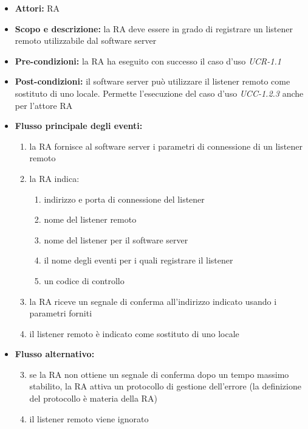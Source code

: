 \begin{itemize}
	\item \textbf{Attori:} RA
	\item \textbf{Scopo e descrizione:} la RA deve essere in grado di registrare un listener remoto utilizzabile dal software server 
	\item \textbf{Pre-condizioni:} la RA ha eseguito con successo il caso d'uso \emph{UCR-1.1}
	\item \textbf{Post-condizioni:} il software server può utilizzare il listener remoto come sostituto di uno locale. Permette l'esecuzione del caso d'uso \emph{UCC-1.2.3} anche per l'attore RA
	\item \textbf{Flusso principale degli eventi:}
		\begin{enumerate}
			\item la RA fornisce al software server i parametri di connessione di un listener remoto
			\item la RA indica:
				\begin{enumerate}
					\item indirizzo e porta di connessione del listener
					\item nome del listener remoto
					\item nome del listener per il software server
					\item il nome degli eventi per i quali registrare il listener
					\item un codice di controllo
				\end{enumerate}
			\item la RA riceve un segnale di conferma all'indirizzo indicato usando i parametri forniti
			\item il listener remoto è indicato come sostituto di uno locale
		\end{enumerate}
	\item \textbf{Flusso alternativo:}
		\begin{enumerate}
			\setcounter{enumi}{2}
			\item se la RA non ottiene un segnale di conferma dopo un tempo massimo stabilito, la RA attiva un protocollo di gestione dell'errore (la definizione del protocollo è materia della RA)
			\item il listener remoto viene ignorato
		\end{enumerate}
\end{itemize}



